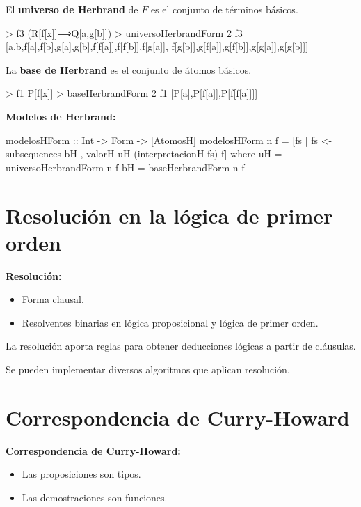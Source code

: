 \documentclass{beamer}
\begin{document}
\begin{frame}[fragile]
  El \textbf{universo de Herbrand} de $F$ es el conjunto de términos básicos.
\begin{sesion}
> f3
(R[f[x]]⟹Q[a,g[b]])
> universoHerbrandForm 2 f3
[a,b,f[a],f[b],g[a],g[b],f[f[a]],f[f[b]],f[g[a]],
f[g[b]],g[f[a]],g[f[b]],g[g[a]],g[g[b]]]
\end{sesion}
\end{frame}

\begin{frame}[fragile]
La \textbf{base de Herbrand} es el conjunto de átomos básicos.

\begin{sesion}
> f1
P[f[x]]
> baseHerbrandForm 2 f1
[P[a],P[f[a]],P[f[f[a]]]]  
\end{sesion}
\end{frame}

\begin{frame}[fragile]
  \textbf{Modelos de Herbrand:}

  \vspace{5mm}
\begin{code}
modelosHForm :: Int -> Form -> [AtomosH]
modelosHForm n f =
 [fs | fs <- subsequences bH
      , valorH uH (interpretacionH fs) f]
  where uH = universoHerbrandForm n f
        bH = baseHerbrandForm n f
\end{code}  
  
\end{frame}

\section{Resolución en la lógica de primer orden}
\begin{frame}
  \textbf{Resolución:}

  \begin{itemize}
  \item Forma clausal.
  \item Resolventes binarias en lógica proposicional y lógica de primer orden.
  \end{itemize}
  La resolución aporta reglas para obtener deducciones lógicas a partir de cláusulas.

  Se pueden implementar diversos algoritmos que aplican resolución.
\end{frame}
\section{Correspondencia de Curry-Howard}
\begin{frame}
  \textbf{Correspondencia de Curry-Howard:}
\vspace{5mm}
  \begin{itemize}
  \item Las proposiciones son tipos.
  \item Las demostraciones son funciones.
  \end{itemize}
\end{frame}
\end{document}
